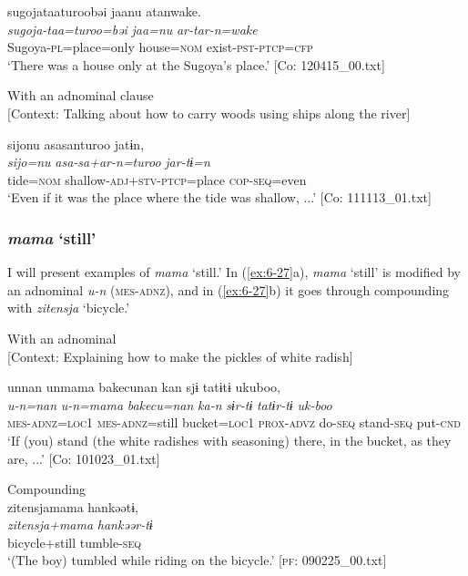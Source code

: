 {\TM}
\glll sugojataaturoobəi  jaanu  atanwake.\\
      \textit{sugoja-taa=turoo=bəi}  \textit{jaa=nu}  \textit{ar-tar-n=wake}\\
      Sugoya-\textsc{pl}=place=only  house=\textsc{nom}  exist-\textsc{pst}-\textsc{ptcp}=\textsc{cfp}\\
\glt ‘There was a house only at the Sugoya’s place.’ [Co: 120415\_00.txt]
\z

\ex With an adnominal clause\\{}
[Context: Talking about how to carry woods using ships along the river]

{\TM}
\glll {\textbar}sijo{\textbar}nu  asasanturoo  jatɨn,\\
      \textit{sijo=nu}  \textit{asa-sa+ar-n=turoo}  \textit{jar-tɨ=n}\\
      tide=\textsc{nom}  shallow-\textsc{adj}+\textsc{stv}-\textsc{ptcp}=place  \textsc{cop}-\textsc{seq}=even\\
\glt ‘Even if it was the place where the tide was shallow, ...’ [Co: 111113\_01.txt]
\z

\subsubsection{ \textit{mama} ‘still’}

I will present examples of \textit{mama} ‘still.’ In (\ref{ex:6-27}a), \textit{mama} ‘still’ is modified by an adnominal \textit{u-n} (\textsc{mes}-\textsc{adnz}), and in (\ref{ex:6-27}b) it goes through compounding with \textit{zitensja} ‘bicycle.’

\ea\label{ex:6-27}
\ea With an adnominal\\{}
[Context: Explaining how to make the pickles of white radish]

{\TM}
\glll unnan  unmama  {\textbar}bakecu{\textbar}nan  kan    sjɨ  tatɨtɨ  ukuboo,\\
      \textit{u-n=nan}  \textit{u-n=mama}  \textit{bakecu=nan}  \textit{ka-n}   \textit{sɨr-tɨ}  \textit{tatɨr-tɨ}  \textit{uk-boo}\\
      \textsc{mes}-\textsc{adnz}=\textsc{loc1}  \textsc{mes}-\textsc{adnz}=still  bucket=\textsc{loc1}  \textsc{prox}-\textsc{advz}  do-\textsc{seq}  stand-\textsc{seq}  put-\textsc{cnd}\\
\glt ‘If (you) stand (the white radishes with seasoning) there, in the bucket, as they are, ...’ [Co: 101023\_01.txt]
\z

\ex Compounding\\
{\TM}
\glll  {\textbar}zitensja{\textbar}mama  hankəətɨ,\\
\textit{zitensja+mama}  \textit{hankəər-tɨ}\\
bicycle+still  tumble-\textsc{seq}\\
\glt ‘(The boy) tumbled while riding on the bicycle.’ [\textsc{pf}: 090225\_00.txt]
\z

